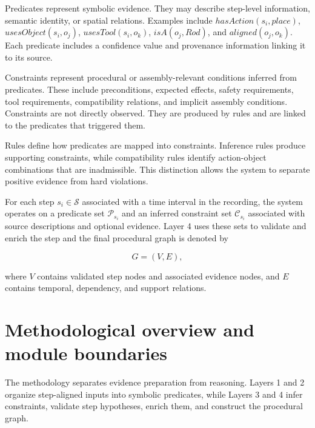 Predicates represent symbolic evidence. They may describe step-level information, semantic identity, or spatial relations. Examples include $hasAction(s_i,place)$, $usesObject(s_i,o_j)$, $usesTool(s_i,o_k)$, $isA(o_j,Rod)$, and $aligned(o_j,o_k)$. Each predicate includes a confidence value and provenance information linking it to its source.

Constraints represent procedural or assembly-relevant conditions inferred from predicates. These include preconditions, expected effects, safety requirements, tool requirements, compatibility relations, and implicit assembly conditions. Constraints are not directly observed. They are produced by rules and are linked to the predicates that triggered them.

Rules define how predicates are mapped into constraints. Inference rules produce supporting constraints, while compatibility rules identify action-object combinations that are inadmissible. This distinction allows the system to separate positive evidence from hard violations.

For each step $s_i \in \mathcal{S}$ associated with a time interval in the recording, the system operates on a predicate set $\mathcal{P}_{s_i}$ and an inferred constraint set $\mathcal{C}_{s_i}$ associated with source descriptions and optional evidence. Layer 4 uses these sets to validate and enrich the step and the final procedural graph is denoted by

\[
G = (V,E),
\]

where $V$ contains validated step nodes and associated evidence nodes, and $E$ contains temporal, dependency, and support relations.



\section{Methodological overview and module boundaries}
\label{sec:method-overview}

The methodology separates evidence preparation from reasoning. Layers 1 and 2 organize step-aligned inputs into symbolic predicates, while Layers 3 and 4 infer constraints, validate step hypotheses, enrich them, and construct the procedural graph.

